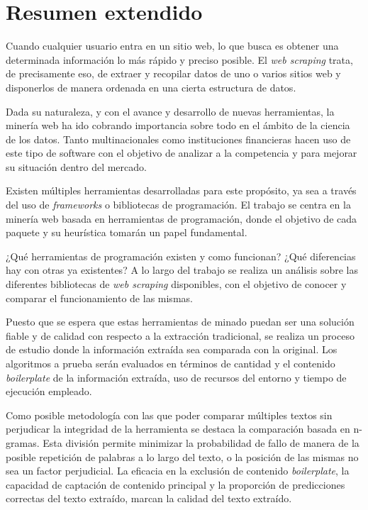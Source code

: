 \chapter*{Resumen extendido}
\label{cha:resumen-extendido}

Cuando cualquier usuario entra en un sitio web, lo que busca es obtener una determinada información lo más
rápido y preciso posible. El \emph{web scraping} trata, de precisamente eso, de extraer y recopilar datos 
de uno o varios sitios web y disponerlos de manera ordenada en una cierta estructura de datos.

Dada su naturaleza, y con el avance y desarrollo de nuevas herramientas, la minería web ha ido cobrando 
importancia sobre todo en el ámbito de la ciencia de los datos. Tanto multinacionales como instituciones 
financieras hacen uso de este tipo de software con el objetivo de analizar a la competencia y para mejorar 
su situación dentro del mercado. 

Existen múltiples herramientas desarrolladas para este propósito, ya sea a través del uso de 
\emph{frameworks} o bibliotecas de programación. El trabajo se centra en la minería web basada en 
herramientas de programación, donde el objetivo de cada paquete y su heurística tomarán un papel fundamental.

¿Qué herramientas de programación existen y como funcionan? ¿Qué diferencias hay con otras ya existentes?
A lo largo del trabajo se realiza un análisis sobre las diferentes bibliotecas de \emph{web scraping}
disponibles, con el objetivo de conocer y comparar el funcionamiento de las mismas.

Puesto que se espera que estas herramientas de minado puedan ser una solución fiable y de calidad con
respecto a la extracción tradicional, se realiza un proceso de estudio donde la información extraída sea
comparada con la original. Los algoritmos a prueba serán evaluados en términos de cantidad y el contenido
\emph{boilerplate} de la información extraída, uso de recursos del entorno y tiempo de ejecución empleado.

Como posible metodología con las que poder comparar múltiples textos sin perjudicar la integridad de la
herramienta se destaca la comparación basada en n-gramas. Esta división permite minimizar la probabilidad
de fallo de manera de la posible repetición de palabras a lo largo del texto, o la posición de las mismas
no sea un factor perjudicial. La eficacia en la exclusión de contenido \emph{boilerplate}, la capacidad de
captación de contenido principal y la proporción de predicciones correctas del texto extraído, marcan la
calidad del texto extraído.

